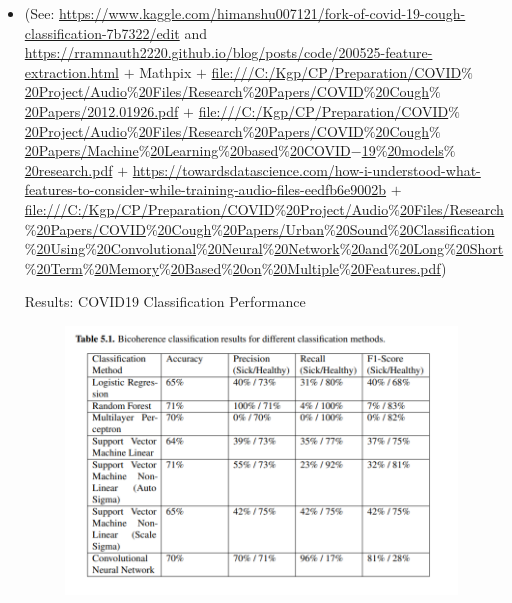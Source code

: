\documentclass[11pt]{article}
\begin{document}
\begin{itemize}
\vspace{1\baselineskip}
	\item (See: \url{https://www.kaggle.com/himanshu007121/fork-of-covid-19-cough-classification-7b7322/edit} and \url{https://rramnauth2220.github.io/blog/posts/code/200525-feature-extraction.html} $+$ Mathpix $+$ \href{file:///C:/Kgp/CP/Preparation/COVID\%20Project/Audio\%20Files/Research\%20Papers/COVID\%20Cough\%20Papers/2012.01926.pdf}{file:///C:/Kgp/CP/Preparation/COVID$\%$20Project/Audio$\%$20Files/Research$\%$20Papers/COVID$\%$20Cough$\%$20Papers/2012.01926.pdf} $+$ \href{file:///C:/Kgp/CP/Preparation/COVID\%20Project/Audio\%20Files/Research\%20Papers/COVID\%20Cough\%20Papers/Machine\%20Learning\%20based\%20COVID-19\%20models\%20research.pdf}{file:///C:/Kgp/CP/Preparation/COVID$\%$20Project/Audio$\%$20Files/Research$\%$20Papers/COVID$\%$20Cough$\%$20Papers/Machine$\%$20Learning$\%$20based$\%$20COVID$-$19$\%$20models$\%$20research.pdf} $+$ \url{https://towardsdatascience.com/how-i-understood-what-features-to-consider-while-training-audio-files-eedfb6e9002b} $+$ \href{file:///C:/Kgp/CP/Preparation/COVID\%20Project/Audio\%20Files/Research\%20Papers/COVID\%20Cough\%20Papers/Urban\%20Sound\%20Classification\%20Using\%20Convolutional\%20Neural\%20Network\%20and\%20Long\%20Short\%20Term\%20Memory\%20Based\%20on\%20Multiple\%20Features.pdf}{file:///C:/Kgp/CP/Preparation/COVID$\%$20Project/Audio$\%$20Files/Research$\%$20Papers/COVID$\%$20Cough$\%$20Papers/Urban$\%$20Sound$\%$20Classification$\%$20Using$\%$20Convolutional$\%$20Neural$\%$20Network$\%$20and$\%$20Long$\%$20Short$\%$20Term$\%$20Memory$\%$20Based$\%$20on$\%$20Multiple$\%$20Features.pdf})

\vspace{18\baselineskip}
{\LARGE Results: COVID19 Classification Performance}

\vspace{2\baselineskip}
\begin{figure}[H]
\includegraphics[width=10.4cm,height=7.13cm]{./images/image3.png}
\end{figure}



\end{itemize}
\end{document}
